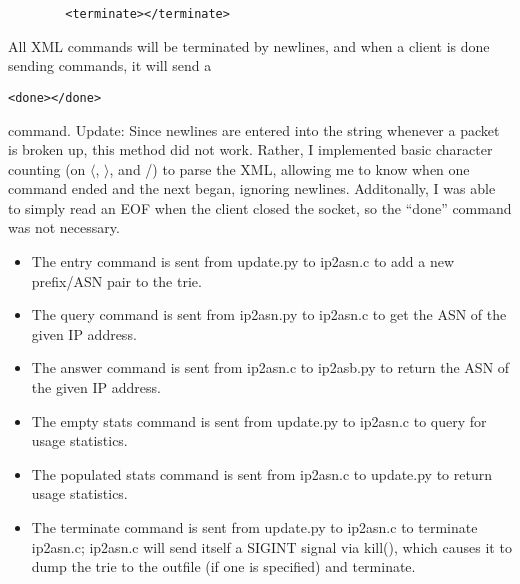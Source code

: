 \documentclass[letterpaper,10pt,fleqn]{article}
\numberwithin{equation}{section}
\begin{document}
\begin{itemize}
\begin{verbatim}
        <terminate></terminate>
    \end{verbatim}
    All XML commands will be terminated by newlines, and when a client is done sending commands, it will send a \begin{verbatim}<done></done>\end{verbatim} command.  Update: Since newlines are entered into the string whenever a packet is broken up, this method did not work.  Rather, I implemented basic character counting (on \(\langle\), \(\rangle\), and /) to parse the XML, allowing me to know when one command ended and the next began, ignoring newlines.  Additonally, I was able to simply read an EOF when the client closed the socket, so the ``done'' command was not necessary.
    \begin{itemize}
        \item The entry command is sent from update.py to ip2asn.c to add a new prefix/ASN pair to the trie.
        \item The query command is sent from ip2asn.py to ip2asn.c to get the ASN of the given IP address.
        \item The answer command is sent from ip2asn.c to ip2asb.py to return the ASN of the given IP address.
        \item The empty stats command is sent from update.py to ip2asn.c to query for usage statistics.
        \item The populated stats command is sent from ip2asn.c to update.py to return usage statistics.
        \item The terminate command is sent from update.py to ip2asn.c to terminate ip2asn.c; ip2asn.c will send itself a SIGINT signal via kill(), which causes it to dump the trie to the outfile (if one is specified) and terminate.
    \end{itemize}
\end{itemize}
\end{document}

